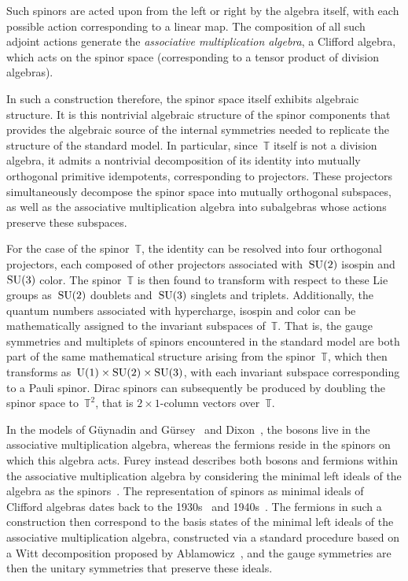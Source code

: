 \documentclass[reqno,11pt]{amsart}
\numberwithin{equation}{section}
\newcommand{\1}{\mbox{\rm 1 \hspace{-1.05 em} 1}}
\newcommand{\U}{{\rm{U}}}
\newcommand{\SU}{{\rm{SU}}}
\newcommand{\bb}[1]{\mathbb{#1}}
\begin{document}
Such spinors are acted upon from the left or right by the algebra itself, with each possible action corresponding to a linear map. The composition of all such adjoint actions generate the \textit{associative multiplication algebra}, a Clifford algebra, which acts on the spinor space (corresponding to a tensor product of division algebras).

In such a construction therefore, the spinor space itself exhibits algebraic structure. It is this nontrivial algebraic structure of the spinor components that provides the algebraic source of the internal symmetries needed to replicate the structure of the standard model. In particular, since~$\bb{T}$ itself is not a division algebra, it admits a nontrivial decomposition of its identity into mutually orthogonal primitive idempotents, corresponding to projectors. These projectors simultaneously decompose the spinor space into mutually orthogonal subspaces, as well as the associative multiplication algebra into subalgebras whose actions preserve these subspaces. 

For the case of the spinor~$\bb{T}$, the identity can be resolved into four orthogonal projectors, each composed of other projectors associated with~$\SU(2)$ isospin and~$\SU(3)$ color. The spinor~$\bb{T}$ is then found to transform with respect to these Lie groups as~$\SU(2)$ doublets and~$\SU(3)$ singlets and triplets. Additionally, the quantum numbers associated with hypercharge, isospin and color can be mathematically assigned to the invariant subspaces of~$\bb{T}$. That is, the gauge symmetries and multiplets of spinors encountered in the standard model are both part of the same mathematical structure arising from the spinor~$\bb{T}$, which then transforms as~$\U(1)\times \SU(2)\times \SU(3)$, with each invariant subspace corresponding to a Pauli spinor. Dirac spinors can subsequently be produced by doubling the spinor space to~$\bb{T}^2$, that is $2\times 1$-column vectors over~$\bb{T}$.

In the models of G\"uynadin and G\"ursey~\cite{gunaydin1973quark} and Dixon~\cite{dixon2013division}, 
the bosons live in the associative multiplication algebra, whereas the fermions reside in the spinors on which this algebra acts. Furey instead describes both bosons and fermions within the associative multiplication algebra by considering the minimal left ideals of the algebra as the spinors~\cite{furey2016standard,furey2018demonstration,furey231,furey232,furey233}. The representation of spinors as minimal ideals of Clifford algebras dates back to the 1930s~\cite{juvet1930operateurs,sauter1930losung} and 1940s~\cite{riesz2013clifford}. The fermions in such a construction then correspond to the basis states of the minimal left ideals of the associative multiplication algebra, constructed via a standard procedure based on a Witt decomposition proposed by Ablamowicz~\cite{ablamowicz1995construction}, and the gauge symmetries are then the unitary symmetries that preserve these ideals.  
\end{document}
